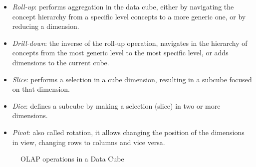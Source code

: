 \begin{itemize}[noitemsep]
  \item \textit{Roll-up}: performs aggregation in the data cube, either by navigating the concept hierarchy from a specific level concepts to a more generic one, or by reducing a dimension.
  \item \textit{Drill-down}: the inverse of the roll-up operation, navigates in the hierarchy of concepts from the most generic level to the most specific level, or adds dimensions to the current cube.
  \item \textit{Slice}: performs a selection in a cube dimension, resulting in a subcube focused on that dimension.
  \item \textit{Dice}: defines a subcube by making a selection (slice) in two or more dimensions.
  \item \textit{Pivot}: also called rotation, it allows changing the position of the dimensions in view, changing rows to columns and vice versa.
\end{itemize}

\begin{figure}[!htb]
  \caption{OLAP operations in a Data Cube}\label{fig:olap}
  \vspace{4mm}
  \begin{center}
  \end{center}
  \vspace{2mm}
\end{figure}

